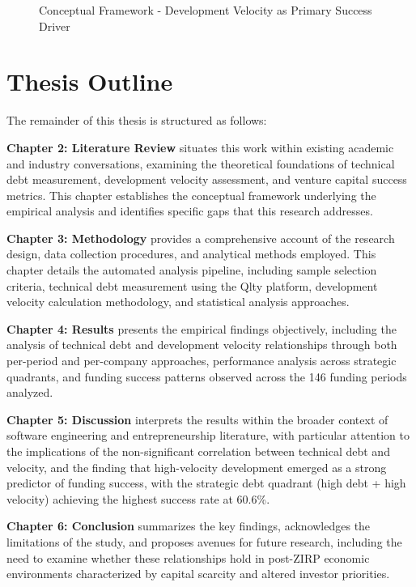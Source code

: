 \begin{figure}[htbp]
\caption{Conceptual Framework - Development Velocity as Primary Success Driver}
\label{fig:conceptual_framework}
\end{figure}

\section{Thesis Outline}\label{sec:outline}

The remainder of this thesis is structured as follows:

\textbf{Chapter 2: Literature Review} situates this work within existing academic and industry conversations, examining the theoretical foundations of technical debt measurement, development velocity assessment, and venture capital success metrics. This chapter establishes the conceptual framework underlying the empirical analysis and identifies specific gaps that this research addresses.

\textbf{Chapter 3: Methodology} provides a comprehensive account of the research design, data collection procedures, and analytical methods employed. This chapter details the automated analysis pipeline, including sample selection criteria, technical debt measurement using the Qlty platform, development velocity calculation methodology, and statistical analysis approaches.

\textbf{Chapter 4: Results} presents the empirical findings objectively, including the analysis of technical debt and development velocity relationships through both per-period and per-company approaches, performance analysis across strategic quadrants, and funding success patterns observed across the 146 funding periods analyzed.

\textbf{Chapter 5: Discussion} interprets the results within the broader context of software engineering and entrepreneurship literature, with particular attention to the implications of the non-significant correlation between technical debt and velocity, and the finding that high-velocity development emerged as a strong predictor of funding success, with the strategic debt quadrant (high debt + high velocity) achieving the highest success rate at 60.6\%.

\textbf{Chapter 6: Conclusion} summarizes the key findings, acknowledges the limitations of the study, and proposes avenues for future research, including the need to examine whether these relationships hold in post-\ac{ZIRP} economic environments characterized by capital scarcity and altered investor priorities.